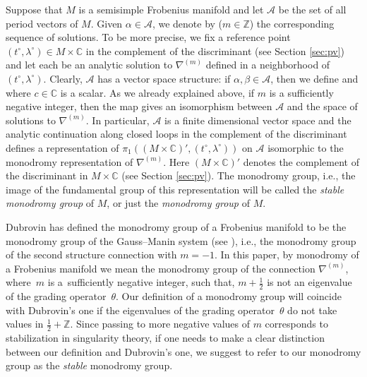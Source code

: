 \documentclass[10pt,a4paper]{article}
\numberwithin{equation}{section}
\newcommand{\CC}{\mathbb{C}}
\newcommand{\ZZ}{\mathbb{Z}}
\newcommand{\A}{\mathcal{A}}
\begin{document}
Suppose that $M$ is a semisimple Frobenius manifold and let $\A$ be the set of all period vectors of $M$. Given $\alpha\in \A$, we denote by  ($m\in \ZZ$) the corresponding sequence of solutions. To be more precise, we fix a reference point $(t^\circ,\lambda^\circ)\in M\times \CC$ in the complement of the discriminant (see Section \ref{sec:pv}) and let each  be an analytic solution to $\nabla^{(m)}$ defined in a neighborhood of $(t^\circ,\lambda^\circ)$. Clearly, $\A$ has a vector space structure: if $\alpha,\beta\in \A$, then we define  and
 where $c\in \CC$ is a scalar. As we already explained above, if $m$ is a sufficiently negative integer, then the map  gives an isomorphism between $\A$ and the space of solutions to $\nabla^{(m)}$. In particular, $\A$ is a finite dimensional vector space and the analytic continuation along closed loops in the complement of the discriminant defines a representation of $\pi_1((M\times \CC)',(t^\circ,\lambda^\circ))$ on $\A$ isomorphic to the monodromy representation of $\nabla^{(m)}$. Here $(M\times \CC)'$ denotes the complement of the discriminant in $M\times \CC$ (see Section \ref{sec:pv}). The monodromy group, i.e., the image of the fundamental group of this representation will be called the {\em stable monodromy group} of $M$, or just the {\em monodromy group} of $M$.
\begin{Remark}\label{re:monodromy}
Dubrovin has defined the monodromy group of a Frobenius manifold to be the monodromy group of the Gauss--Manin system (see \cite[Definition~5.6]{Dubrovin1999}), i.e., the monodromy group of the second structure connection with $m=-1$.
In this paper, by monodromy of a Frobenius manifold we mean the
monodromy group of the connection $\nabla^{(m)}$, where~$m$ is a~sufficiently
negative integer, such that, $m+\tfrac{1}{2}$ is not an eigenvalue of
the grading operator~$\theta$. Our definition of a monodromy group
will coincide with Dubrovin's one if the eigenvalues of the grading
operator~$\theta$ do not take values in $\tfrac{1}{2}+\ZZ$. Since
passing to more negative values of $m$ corresponds to stabilization in
singularity theory, if one needs to make a clear distinction between our definition and Dubrovin's one, we suggest to refer to our monodromy group as the {\em stable} monodromy group.
\end{Remark}
\end{document}
